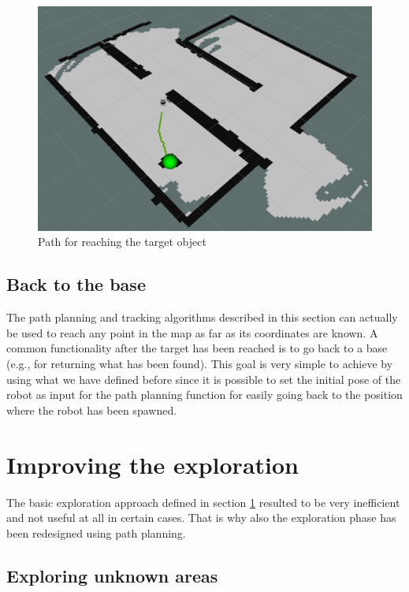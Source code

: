 \documentclass[9pt,conference]{IEEEtran}
\begin{document}
\begin{figure}[h!]
    \centering
    \includegraphics[width=1\linewidth]{images/02G target_plan crop.png}
    \caption{Path for reaching the target object}
    \label{fig:path-planning}
\end{figure}

\subsection{Back to the base}
\label{sec:back-to-base}

The path planning and tracking algorithms described in this section can actually be used to reach any point in the map as far as its coordinates are known. A common functionality after the target has been reached is to go back to a base (e.g., for returning what has been found). This goal is very simple to achieve by using what we have defined before since it is possible to set the initial pose of the robot as input for the path planning function for easily going back to the position where the robot has been spawned.




\section{Improving the exploration}
\label{sec:improve-exploration}

The basic exploration approach defined in section \ref{sec:improve-exploration} resulted to be very inefficient and not useful at all in certain cases. That is why also the exploration phase has been redesigned using path planning.


\subsection{Exploring unknown areas}
\label{sec:unknown-exploration}
\end{document}
